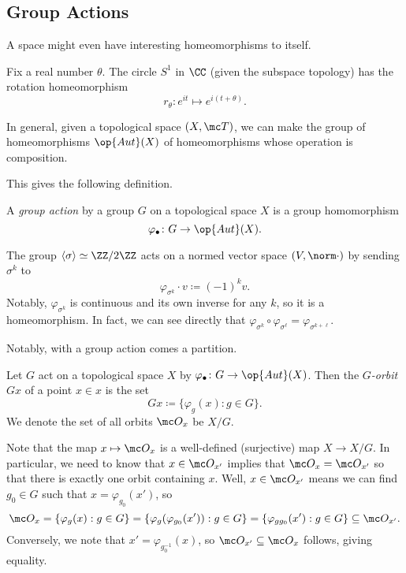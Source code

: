 \documentclass[../notes.tex]{subfiles}
\begin{document}
\subsection{Group Actions}
A space might even have interesting homeomorphisms to itself.
\begin{example}
	Fix a real number $\theta$. The circle $S^1$ in $\CC$ (given the subspace topology) has the rotation homeomorphism
	\[r_\theta\colon e^{it}\mapsto e^{i(t+\theta)}.\]
\end{example}
\begin{remark}
	In general, given a topological space $(X,\mc T)$, we can make the group of homeomorphisms $\op{Aut}(X)$ of homeomorphisms whose operation is composition.
\end{remark}
This gives the following definition.
\begin{definition}
	A \textit{group action} by a group $G$ on a topological space $X$ is a group homomorphism
	\[\varphi_\bullet\colon G\to\op{Aut}(X).\]
\end{definition}
\begin{example}
	The group $\langle\sigma\rangle\simeq\ZZ/2\ZZ$ acts on a normed vector space $(V,\norm\cdot)$ by sending $\sigma^k$ to
	\[\varphi_{\sigma^k}\cdot v\coloneqq(-1)^kv.\]
	Notably, $\varphi_{\sigma^k}$ is continuous and its own inverse for any $k$, so it is a homeomorphism. In fact, we can see directly that $\varphi_{\sigma^k}\circ\varphi_{\sigma^\ell}=\varphi_{\sigma^{k+\ell}}$.
\end{example}
Notably, with a group action comes a partition.
\begin{definition}[Orbit]
	Let $G$ act on a topological space $X$ by $\varphi_\bullet\colon G\to\op{Aut}(X)$. Then the \textit{$G$-orbit} $Gx$ of a point $x\in x$ is the set
	\[Gx\coloneqq\{\varphi_g(x):g\in G\}.\]
	We denote the set of all orbits $\mc O_x$ be $X/G$.
\end{definition}
\begin{remark}
	Note that the map $x\mapsto\mc O_x$ is a well-defined (surjective) map $X\to X/G$. In particular, we need to know that $x\in\mc O_{x'}$ implies that $\mc O_x=\mc O_{x'}$ so that there is exactly one orbit containing $x$. Well, $x\in\mc O_{x'}$ means we can find $g_0\in G$ such that $x=\varphi_{g_0}(x')$, so
	\[\mc O_x=\{\varphi_g(x):g\in G\}=\{\varphi_g(\varphi_{g_0}(x')):g\in G\}=\{\varphi_{gg_0}(x'):g\in G\}\subseteq\mc O_{x'}.\]
	Conversely, we note that $x'=\varphi_{g_0^{-1}}(x)$, so $\mc O_{x'}\subseteq\mc O_x$ follows, giving equality.
\end{remark}
\end{document}
